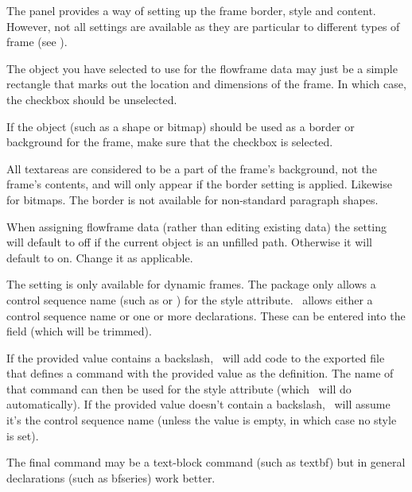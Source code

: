 The  panel provides a way of setting up the
frame border, style and content. However, not all settings are
available as they are particular to different types of frame
(see ).


The object you have selected to use for the \gls{flowframe} data may
just be a simple rectangle that marks out the location and
dimensions of the frame. In which case, the 
checkbox should be unselected.

If the object (such as a \gls{shape} or \gls{bitmap}) should be used
as a border or background for the frame, make sure that the
 checkbox is selected.

\begin{information}
All \glspl{textarea} are considered to be a part of the
frame's background, not the frame's contents, and will only appear if
the border  setting is
applied. Likewise for \glspl{bitmap}. The border is not available
for non-standard paragraph shapes.
\end{information}

When assigning \gls{flowframe} data (rather than editing
existing data) the  setting will
default to off if the current object is an unfilled \gls{path}.
Otherwise it will default to on. Change it as applicable.

The  setting is only available for
dynamic frames. The  package only allows a control
sequence name (such as  or ) for the style
attribute.  \FlowframTk\ allows either a control sequence name or
one or more declarations. These can be entered into the
 field (which will be trimmed).

If the provided value contains a backslash, \FlowframTk\ will add
code to the exported file that defines a command with the provided
value as the definition. The name of that command can then be used
for the style attribute (which \FlowframTk\ will do automatically). 
If the provided value doesn't contain a
backslash, \FlowframTk\ will assume it's the control sequence name
(unless the value is empty, in which case no style is set).

The final command may be a text-block command (such as \gls{textbf})
but in general declarations (such as \gls{bfseries}) work better.


